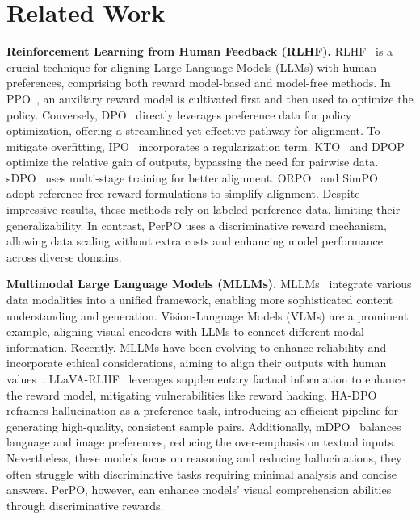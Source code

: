 \section{Related Work}
\textbf{Reinforcement Learning from Human Feedback (RLHF).} 
RLHF~\citep{christiano2017deep, 2020Learning} is a crucial technique for aligning Large Language Models (LLMs) with human preferences, comprising both reward model-based and model-free methods. In PPO~\citep{schulman2017proximal, instructgpt}, an auxiliary reward model is cultivated first and then used to optimize the policy. Conversely, DPO~\citep{rafailov2024direct} directly leverages preference data for policy optimization, offering a streamlined yet effective pathway for alignment. To mitigate overfitting, IPO~\citep{azar2024general} incorporates a regularization term. KTO~\citep{ethayarajh2024kto} and DPOP~\citep{pal2024smaug} optimize the relative gain of outputs, bypassing the need for pairwise data. sDPO~\citep{kim2024sdpo} uses multi-stage training for better alignment. ORPO~\citep{hong2403orpo} and SimPO~\citep{meng2024simpo} adopt reference-free reward formulations to simplify alignment. Despite impressive results, these methods rely on labeled perference data, limiting their generalizability. In contrast, PerPO uses a discriminative reward mechanism, allowing data scaling without extra costs and enhancing model performance across diverse domains.




\textbf{Multimodal Large Language Models (MLLMs).} 
MLLMs~\citep{liu2024visual, yu2023merlin, zhu2024self, dreamllm, text-to-audio, video-llava} integrate various data modalities into a unified framework, enabling more sophisticated content understanding and generation. Vision-Language Models (VLMs) are a prominent example, aligning visual encoders with LLMs to connect different modal information. Recently, MLLMs have been evolving to enhance reliability and incorporate ethical considerations, aiming to align their outputs with human values~\citep{amirloo2024understanding, yu2024rlhf, xu2024survey}. LLaVA-RLHF~\citep{sun2023aligning} leverages supplementary factual information to enhance the reward model, mitigating vulnerabilities like reward hacking. HA-DPO~\citep{zhao2023beyond} reframes hallucination as a preference task, introducing an efficient pipeline for generating high-quality, consistent sample pairs. Additionally, mDPO~\citep{wang2024mdpo} balances language and image preferences, reducing the over-emphasis on textual inputs. Nevertheless, these models focus on reasoning and reducing hallucinations, they often struggle with discriminative tasks requiring minimal analysis and concise answers. PerPO, however, can enhance models' visual comprehension abilities through discriminative rewards. 





